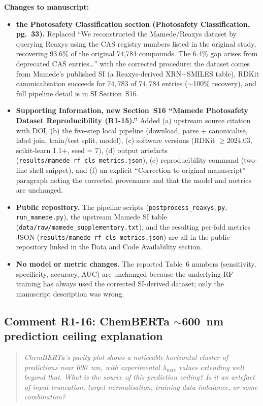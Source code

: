\documentclass[11pt]{article}
\newenvironment{reviewer}{%
  \begin{quote}\itshape\color{black!70}}{%
  \end{quote}}
\newenvironment{changes}{%
  \noindent\textbf{Changes to manuscript:}
  \begin{itemize}[leftmargin=2em,itemsep=2pt]}{%
  \end{itemize}\medskip}
\begin{document}
\begin{changes}
  \item \textbf{the Photosafety Classification section (Photosafety Classification, pg.\ 33).} Replaced ``We reconstructed the Mamede/Reaxys dataset by querying Reaxys using the CAS registry numbers listed in the original study, recovering 93.6\% of the original 74,784 compounds. The 6.4\% gap arises from deprecated CAS entries\ldots'' with the corrected procedure: the dataset comes from Mamede's published SI (a Reaxys-derived XRN+SMILES table), RDKit canonicalisation succeeds for $74{,}783$ of $74{,}784$ entries ($\sim$100\% recovery), and full pipeline detail is in SI Section~S16.
  \item \textbf{Supporting Information, new Section~S16 ``Mamede Photosafety Dataset Reproducibility (R1-15).''} Added (a) upstream source citation with DOI, (b) the five-step local pipeline (download, parse + canonicalise, label join, train/test split, model), (c) software versions (RDKit $\geq 2024.03$, scikit-learn 1.1+, seed = 7), (d) output artefacts (\texttt{results/mamede\_rf\_cls\_metrics.json}), (e) reproducibility command (two-line shell snippet), and (f) an explicit ``Correction to original manuscript'' paragraph noting the corrected provenance and that the model and metrics are unchanged.
  \item \textbf{Public repository.} The pipeline scripts (\texttt{postprocess\_reaxys.py}, \texttt{run\_mamede.py}), the upstream Mamede SI table (\texttt{data/raw/mamede\_supplementary.txt}), and the resulting per-fold metrics JSON (\texttt{results/mamede\_rf\_cls\_metrics.json}) are all in the public repository linked in the Data and Code Availability section.
  \item \textbf{No model or metric changes.} The reported Table~6 numbers (sensitivity, specificity, accuracy, AUC) are unchanged because the underlying RF training has always used the corrected SI-derived dataset; only the manuscript description was wrong.
\end{changes}

\subsection*{Comment R1-16: ChemBERTa $\sim$600~nm prediction ceiling explanation}
\begin{reviewer}
ChemBERTa's parity plot shows a noticeable horizontal cluster of predictions near 600~nm, with experimental $\lambda_{\max}$ values extending well beyond that. What is the source of this prediction ceiling? Is it an artefact of input truncation, target normalisation, training-data imbalance, or some combination?
\end{reviewer}
\end{document}
